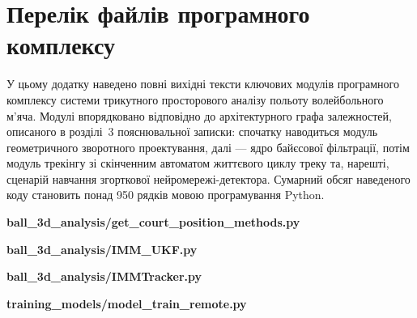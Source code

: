 \documentclass[%
  ukrainian, utf8, columnvii, simple,
  hpadding=10mm, vpadding=10mm, reduceheight=2mm,
  floatsection,
]{eskdtext}
\newcommand{\srcFile}[2]{%
  \textbf{#1}

  

  \bigskip
}
\begin{document}
\maketitle
{}

\section*{Перелік файлів програмного комплексу}

У цьому додатку наведено повні вихідні тексти ключових модулів програмного
комплексу системи трикутного просторового аналізу польоту волейбольного м'яча.
Модулі впорядковано відповідно до архітектурного графа залежностей, описаного
в розділі~3 пояснювальної записки: спочатку наводиться модуль геометричного
зворотного проектування, далі --- ядро байєсової фільтрації, потім модуль
трекінгу зі скінченним автоматом життєвого циклу треку та, нарешті, сценарій
навчання згорткової нейромережі-детектора. Сумарний обсяг наведеного коду
становить понад 950 рядків мовою програмування Python.

\bigskip

\srcFile{ball\_3d\_analysis/get\_court\_position\_methods.py}%
{../ball\_3d\_analysis/get\_court\_position\_methods.py}

\srcFile{ball\_3d\_analysis/IMM\_UKF.py}%
{../ball\_3d\_analysis/IMM\_UKF.py}

\srcFile{ball\_3d\_analysis/IMMTracker.py}%
{../ball\_3d\_analysis/IMMTracker.py}

\srcFile{training\_models/model\_train\_remote.py}%
{../training\_models/model\_train\_remote.py}
\end{document}
